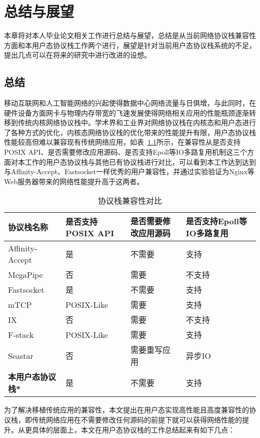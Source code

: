 \chapter{总结与展望}
本章将对本人毕业论文相关工作进行总结与展望，总结是从当前网络协议栈兼容性方面和本用户态协议栈工作两个进行，展望是针对当前用户态协议栈系统的不足，提出几点可以在将来的研究中进行改进的设想。
\section{总结}
移动互联网和人工智能网络的兴起使得数据中心网络流量与日俱增，与此同时，在硬件设备方面网卡与物理内存带宽的飞速发展使得网络相关应用的性能瓶颈逐渐转移到传统内核网络协议栈中。学术界和工业界对网络协议栈在内核态和用户态进行了各种方式的优化，内核态网络协议栈的优化带来的性能提升有限，用户态协议栈性能较高但难以兼容现有传统网络应用，如表~\ref{tab:compare}所示，在兼容性从是否支持POSIX API、是否需要修改应用源码、是否支持Epoll等IO多路复用机制这三个方面对本工作的用户态协议栈与其他已有协议栈进行对比，可以看到本工作达到达到与Affinity-Accept、Fastsocket一样优秀的用户兼容性，并通过实验验证为Nginx等Web服务器带来的网络性能提升高于这两者。

\begin{table}[]
\centering
\caption{协议栈兼容性对比}
\label{tab:compare}
\begin{tabular}{lllp{3cm}}
\toprule[1.5pt]
\textbf{协议栈名称} & \textbf{是否支持POSIX API} & \textbf{是否需要修改应用源码} & \textbf{是否支持Epoll等IO多路复用} \\ 
\midrule[1pt]
Affinity-Accept & 是 & 不需要 & 支持 \\
MegaPipe &  否  & 需要  & 不支持 \\
Fastsocket & 是 & 不需要 & 支持 \\
mTCP & POSIX-Like & 需要 & 支持 \\
IX & 否 & 需要 & 不支持 \\
F-stack & POSIX-Like & 需要 & 支持 \\
Seastar & 否 & 需要重写应用 & 异步IO \\
\textbf{本用户态协议栈*} & 是 & 不需要 & 支持 \\
\bottomrule[1.5pt]
\end{tabular}
\end{table}

为了解决移植传统应用的兼容性，本文提出在用户态实现高性能且高度兼容性的协议栈，即传统网络应用在不需要修改任何源码的前提下就可以获得网络性能的提升。从更具体的层面上，本文在用户态协议栈的工作总结起来有如下几点：

